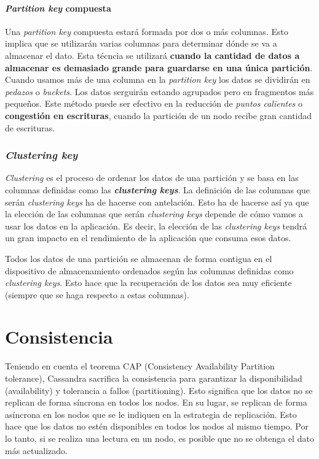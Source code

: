 \documentclass[
]{book}
\begin{document}
\paragraph{\texorpdfstring{\emph{Partition key} compuesta}{Partition key compuesta}}\label{partition-key-compuesta}

Una \emph{partition key} compuesta estará formada por dos o más columnas. Esto implica que se utilizarán varias columnas para determinar dónde se va a almacenar el dato. Esta técncia se utilizará \textbf{cuando la cantidad de datos a almacenar es demasiado grande para guardarse en una única partición}. Cuando usamos más de una columna en la \emph{partition key} los datos se dividirán en \emph{pedazos} o \emph{buckets}. Los datos serguirán estando agrupados pero en fragmentos más pequeños. Este método puede ser efectivo en la reducción de \emph{puntos calientes} o \textbf{congestión en escrituras}, cuando la partición de un nodo recibe gran cantidad de escrituras.

\subsubsection{\texorpdfstring{\emph{Clustering key}}{Clustering key}}\label{clustering-key}

\emph{Clustering} es el proceso de ordenar los datos de una partición y se basa en las columnas definidas como las \textbf{\emph{clustering keys}}. La definición de las columnas que serán \emph{clustering keys} ha de hacerse con antelación. Esto ha de hacerse así ya que la elección de las columnas que serán \emph{clustering keys} depende de cómo vamos a usar los datos en la aplicación. Es decir, la elección de las \emph{clustering keys} tendrá un gran impacto en el rendimiento de la aplicación que consuma esos datos.

Todos los datos de una partición se almacenan de forma contigua en el dispositivo de almacenamiento ordenados según las columnas definidas como \emph{clustering keys}. Esto hace que la recuperación de los datos sea muy eficiente (siempre que se haga respecto a estas columnas).

\section{Consistencia}\label{consistencia}

Teniendo en cuenta el teorema CAP (Consistency Availability Partition tolerance), Cassandra sacrifica la consistencia para garantizar la disponibilidad (availability) y tolerancia a fallos (partitioning). Esto significa que los datos no se replican de forma síncrona en todos los nodos. En su lugar, se replican de forma asíncrona en los nodos que se le indiquen en la estrategia de replicación. Esto hace que los datos no estén disponibles en todos los nodos al mismo tiempo. Por lo tanto, si se realiza una lectura en un nodo, es posible que no se obtenga el dato más actualizado.
\end{document}

